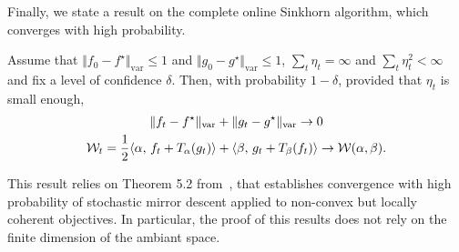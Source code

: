 Finally, we state a result on the complete online Sinkhorn algorithm, which converges with high probability.
\begin{proposition}\label{prop:convergence}
    Assume that $\Vert f_0 - f^\star \Vert_{\text{var}} \leq 1$ and $\Vert g_0 -
    g^\star \Vert_{\text{var}} \leq 1$, $\sum_t \eta_t = \infty$ and $\sum_t
    \eta_t^2 < \infty$ and fix a level of confidence $\delta$. Then, with
    probability $1- \delta$, provided that $\eta_t$ is small enough,
    \begin{gather}
        \Vert f_t - f^\star \Vert_{\text{var}} + \Vert g_t - 
        g^\star \Vert_{\text{var}} \to 0 \\
        \mathcal{W}_t =\frac{1}{2} \langle \alpha,\,f_t + T_{\alpha}(g_t)\rangle + \langle \beta,\,g_t + T_{\beta}(f_t)\rangle 
        \to \mathcal{W}(\alpha, \beta).
    \end{gather}
\end{proposition}
This result relies on Theorem 5.2 from~\citet{zhou2017convergence}, that establishes convergence with
high probability of stochastic mirror descent applied to non-convex but locally coherent objectives. In particular, the proof of this results does not rely on the finite dimension of the ambiant space.

